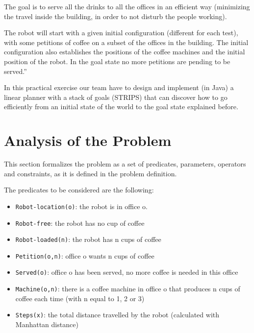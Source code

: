 \documentclass[12pt,a4paper,oneside]{article}
\numberwithin{equation}{section}
\numberwithin{equation}{section}
\theoremstyle{definition}
\begin{document}
The goal is to serve all the drinks to all the offices in an efficient way (minimizing the travel inside the building, in order to not disturb the people working).


The robot will start with a given initial configuration (different for each test), with some petitions of coffee on a subset of the offices in the building. The initial configuration also establishes the positions of the coffee machines and the initial position of the robot. In the goal state no more petitions are pending to be served.”


In this practical exercise our team have to design and implement (in Java) a linear planner with a stack of goals (STRIPS) that can discover how to go efficiently from an initial state of the world to the goal state explained before.


\newpage

\section{Analysis of the Problem} \label{Analysis of the Problem}

This section formalizes the problem as a set of predicates, parameters, operators and constraints, as it is defined in the problem definition\cite{problemdefinition}.


The predicates to be considered are the following:
\begin{itemize}
	\item \texttt{Robot-location(o)}: the robot is in office o.
	\item \texttt{Robot-free}: the robot has no cup of coffee
	\item \texttt{Robot-loaded(n)}: the robot has n cups of coffee
	\item \texttt{Petition(o,n)}: office o wants n cups of coffee
	\item \texttt{Served(o)}: office o has been served, no more coffee is needed in this office
	\item \texttt{Machine(o,n)}: there is a coffee machine in office o that produces n cups of coffee each time (with n equal to 1, 2 or 3)
	\item \texttt{Steps(x)}: the total distance travelled by the robot (calculated with Manhattan distance)
\end{itemize}
\end{document}
